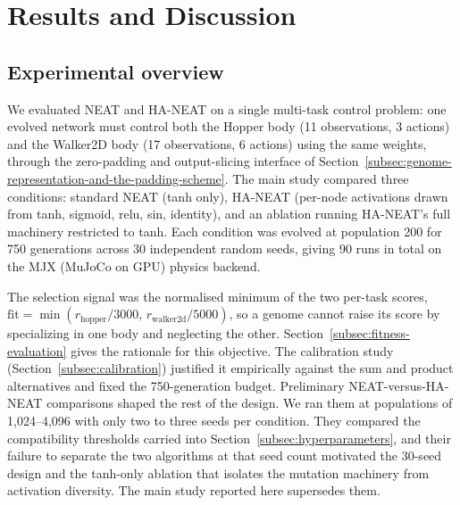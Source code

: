 \documentclass[12pt]{article}
\begin{document}

\newpage

\section{Results and Discussion}
\label{sec:results-and-discussion}

\subsection{Experimental overview}
\label{subsec:experimental-overview}
We evaluated NEAT and HA-NEAT on a single multi-task control problem: one evolved network must control both the Hopper body (11 observations, 3 actions) and the Walker2D body (17 observations, 6 actions) using the same weights, through the zero-padding and output-slicing interface of Section~\ref{subsec:genome-representation-and-the-padding-scheme}.
The main study compared three conditions: standard NEAT (tanh only), HA-NEAT (per-node activations drawn from tanh, sigmoid, relu, sin, identity), and an ablation running HA-NEAT's full machinery restricted to tanh.
Each condition was evolved at population 200 for 750 generations across 30 independent random seeds, giving 90 runs in total on the MJX (MuJoCo on GPU) physics backend.

The selection signal was the normalised minimum of the two per-task scores, $\mathrm{fit} = \min(r_{\text{hopper}}/3000,\, r_{\text{walker2d}}/5000)$, so a genome cannot raise its score by specializing in one body and neglecting the other.
Section~\ref{subsec:fitness-evaluation} gives the rationale for this objective. The calibration study (Section~\ref{subsec:calibration}) justified it empirically against the sum and product alternatives and fixed the 750-generation budget.
Preliminary NEAT-versus-HA-NEAT comparisons shaped the rest of the design. We ran them at populations of 1{,}024--4{,}096 with only two to three seeds per condition. They compared the compatibility thresholds carried into Section~\ref{subsec:hyperparameters}, and their failure to separate the two algorithms at that seed count motivated the 30-seed design and the tanh-only ablation that isolates the mutation machinery from activation diversity. The main study reported here supersedes them.
\end{document}

